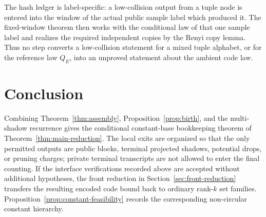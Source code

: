 \documentclass[11pt]{article}
\begin{document}
The hash ledger is label-specific: a low-collision output from a tuple node is
entered into the window of the actual public sample label which produced it.
The fixed-window theorem then works with the conditional law of that one
sample label and realizes the required independent copies by the Renyi copy
lemma.  Thus no step converts a low-collision statement for a mixed tuple
alphabet, or for the reference law $Q_E$, into an unproved statement about the
ambient code law.

\section{Conclusion}

Combining Theorem~\ref{thm:assembly}, Proposition~\ref{prop:birth}, and the
multi-shadow recurrence gives the conditional constant-base bookkeeping theorem
of Theorem~\ref{thm:main-reduction}.  The local exits are organized so that the
only permitted outputs are public blocks, terminal projected shadows, potential
drops, or pruning charges; private terminal transcripts are not allowed to enter
the final counting.  If the interface verifications recorded above are accepted
without additional hypotheses, the front reduction in
Section~\ref{sec:front-reduction} transfers the resulting encoded code bound
back to ordinary rank-$k$ set families.  Proposition~\ref{prop:constant-feasibility}
records the corresponding non-circular constant hierarchy.
\end{document}

